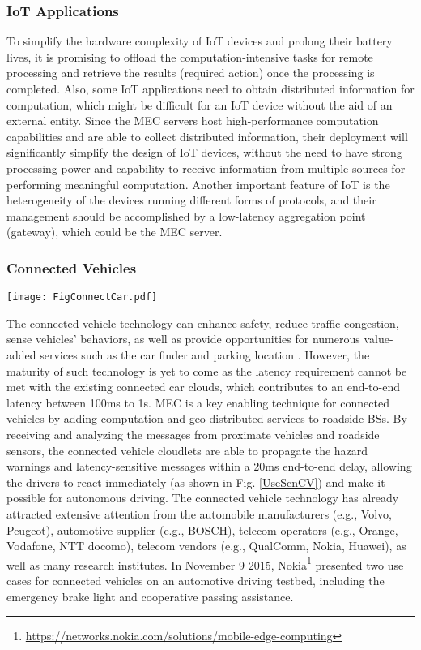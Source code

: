 \documentclass[journal]{IEEEtran}
\begin{document}
{\subsubsection{\textbf{IoT Applications}}
To simplify the hardware complexity of IoT devices and prolong their battery lives, it is promising to offload the computation-intensive tasks for remote processing and retrieve the results (required action) once the processing is completed. Also, some IoT applications need to obtain distributed information for computation, which might be difficult for an IoT device without the aid of an external entity. Since the MEC servers host high-performance computation capabilities and are able to collect distributed information, their deployment will significantly simplify the design of IoT devices, without the need to have strong processing power and capability to receive information from multiple sources for performing meaningful computation. Another important feature of IoT is the heterogeneity of the devices running different forms of protocols, and their management should be accomplished by a low-latency aggregation point (gateway), which could be the MEC server.

\subsubsection{\textbf{Connected Vehicles}}
\begin{figure*}[!t]
\begin{center}
   \texttt{[image: FigConnectCar.pdf]}
\end{center}
\caption{\color{black}{MEC for connected vehicles.}}
\label{UseScnCV}
\end{figure*}

The connected vehicle technology can enhance safety, reduce traffic congestion, sense vehicles' behaviors, as well as provide opportunities for numerous value-added services such as the car finder and parking location \cite{Papadimitratos0911,NLu1404,Uhlemann1501}. However, the maturity of such technology is yet to come as the latency requirement cannot be met with the existing connected car clouds, which contributes to an end-to-end latency between 100ms to 1s. MEC is a key enabling technique for connected vehicles by adding computation and geo-distributed services to roadside BSs. By receiving and analyzing the messages from proximate vehicles and roadside sensors, the connected vehicle cloudlets are able to propagate the hazard warnings and latency-sensitive messages within a 20ms end-to-end delay, allowing the drivers to react immediately (as shown in Fig. \ref{UseScnCV}) and make it possible for autonomous driving. The connected vehicle technology has already attracted extensive attention from the automobile manufacturers (e.g., Volvo, Peugeot), automotive supplier (e.g., BOSCH), telecom operators (e.g., Orange, Vodafone, NTT docomo), telecom vendors (e.g., QualComm, Nokia, Huawei), as well as many research institutes. In November 9 2015, Nokia\footnote{\url{https://networks.nokia.com/solutions/mobile-edge-computing}} presented two use cases for connected vehicles on an automotive driving testbed, including the emergency brake light and cooperative passing assistance.

}
\end{document}
